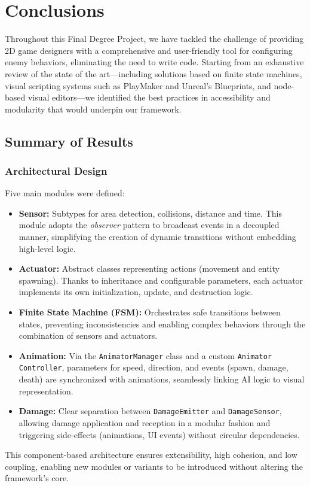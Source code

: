 \chapter{Conclusions}

Throughout this Final Degree Project, we have tackled the challenge of providing 2D game designers with a comprehensive and user-friendly tool for configuring enemy behaviors, eliminating the need to write code. Starting from an exhaustive review of the state of the art—including solutions based on finite state machines, visual scripting systems such as PlayMaker and Unreal’s Blueprints, and node-based visual editors—we identified the best practices in accessibility and modularity that would underpin our framework.

\section{Summary of Results}

\subsection{Architectural Design}
Five main modules were defined:
\begin{itemize}
  \item \textbf{Sensor:} Subtypes for area detection, collisions, distance and time. This module adopts the \emph{observer} pattern to broadcast events in a decoupled manner, simplifying the creation of dynamic transitions without embedding high-level logic.
  \item \textbf{Actuator:} Abstract classes representing actions (movement and entity spawning). Thanks to inheritance and configurable parameters, each actuator implements its own initialization, update, and destruction logic.
  \item \textbf{Finite State Machine (FSM):} Orchestrates safe transitions between states, preventing inconsistencies and enabling complex behaviors through the combination of sensors and actuators.
  \item \textbf{Animation:} Via the \texttt{AnimatorManager} class and a custom \texttt{Animator Controller}, parameters for speed, direction, and events (spawn, damage, death) are synchronized with animations, seamlessly linking AI logic to visual representation.
  \item \textbf{Damage:} Clear separation between \texttt{DamageEmitter} and \texttt{DamageSensor}, allowing damage application and reception in a modular fashion and triggering side-effects (animations, UI events) without circular dependencies.
\end{itemize}
This component-based architecture ensures extensibility, high cohesion, and low coupling, enabling new modules or variants to be introduced without altering the framework’s core.

